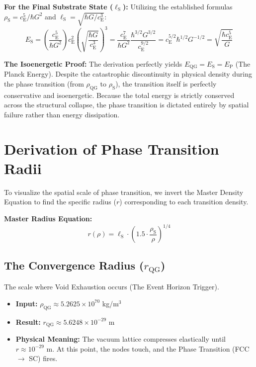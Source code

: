 \noindent\textbf{For the Final Substrate State ($\ell_{\mathrm{S}}$):} Utilizing the established formulas $\rho_{\mathrm{S}} = c_{\mathrm{E}}^5 / \hbar G^2$ and $\ell_{\mathrm{S}} = \sqrt{\hbar G / c_{\mathrm{E}}^3}$:
\begin{equation}
    E_{\mathrm{S}} = \left(\frac{c_{\mathrm{E}}^5}{\hbar G^2}\right) c_{\mathrm{E}}^2 \left(\sqrt{\frac{\hbar G}{c_{\mathrm{E}}^3}}\right)^3 = \frac{c_{\mathrm{E}}^7}{\hbar G^2} \frac{\hbar^{3/2} G^{3/2}}{c_{\mathrm{E}}^{9/2}} = c_{\mathrm{E}}^{5/2} \hbar^{1/2} G^{-1/2} = \sqrt{\frac{\hbar c_{\mathrm{E}}^5}{G}}
\end{equation}

\noindent\textbf{The Isoenergetic Proof:} The derivation perfectly yields $E_{\mathrm{QG}} = E_{\mathrm{S}} = E_{\mathrm{P}}$ (The Planck Energy). Despite the catastrophic discontinuity in physical density during the phase transition (from $\rho_{\mathrm{QG}}$ to $\rho_{\mathrm{S}}$), the transition itself is perfectly conservative and isoenergetic. Because the total energy is strictly conserved across the structural collapse, the phase transition is dictated entirely by spatial failure rather than energy dissipation.

\section{Derivation of Phase Transition Radii}
To visualize the spatial scale of phase transition, we invert the Master Density Equation to find the specific radius ($r$) corresponding to each transition density.

\noindent\textbf{Master Radius Equation:}
\begin{equation}
    r(\rho) = \ell_{\mathrm{S}} \cdot \left(1.5 \cdot \frac{\rho_{\mathrm{S}}}{\rho}\right)^{1/4}
\end{equation}

\subsection{The Convergence Radius ($r_{\mathrm{QG}}$)}
The scale where Void Exhaustion occurs (The Event Horizon Trigger).
\begin{itemize}
    \item \textbf{Input:} $\rho_{\mathrm{QG}} \approx 5.2625 \times 10^{70}$ kg/m$^3$
    \item \textbf{Result:} $r_{\mathrm{QG}} \approx 5.6248 \times 10^{-29}$ m
    \item \textbf{Physical Meaning:} The vacuum lattice compresses elastically until $r \approx 10^{-29}$ m. At this point, the nodes touch, and the Phase Transition (FCC $\to$ SC) fires.
\end{itemize}

